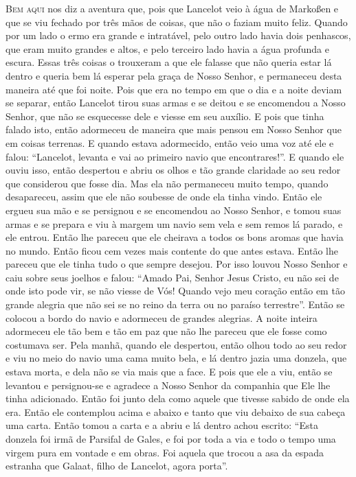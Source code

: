 \textsc{Bem aqui} nos diz a aventura que, pois que Lancelot veio à água de Markoßen
e que se viu fechado por três mãos de coisas, que não o faziam muito feliz. 
Quando por um lado o ermo era grande e intratável, pelo outro lado havia
dois penhascos, que eram muito grandes e altos, e pelo terceiro lado havia a
água profunda e escura. Essas três coisas o trouxeram a que ele falasse que não
queria estar lá dentro e queria bem lá esperar pela graça de Nosso Senhor, e
permaneceu desta maneira até que foi noite. Pois que era no tempo em que o dia
e a noite deviam se separar, então Lancelot tirou suas armas e se deitou e se
encomendou a Nosso Senhor, que não se esquecesse dele e viesse em seu auxílio.
E pois que tinha falado isto, então adormeceu de maneira que mais pensou em
Nosso Senhor que em coisas terrenas. E quando estava adormecido, então veio uma
voz até ele e falou: “Lancelot, levanta e vai ao primeiro navio que
encontrares!”. E quando ele ouviu isso, então despertou e abriu os
olhos e tão grande claridade ao seu redor que considerou que fosse dia. Mas ela
não permaneceu muito tempo, quando desapareceu, assim que ele não soubesse de
onde ela tinha vindo. Então ele ergueu sua mão e se persignou e se encomendou
ao Nosso Senhor, e tomou suas armas e se prepara e viu à margem um navio sem
vela e sem remos lá parado, e ele entrou. Então lhe pareceu que ele cheirava a
todos os bons aromas que havia no mundo. Então ficou cem vezes mais contente do
que antes estava. Então lhe pareceu que ele tinha tudo o que sempre desejou.
Por isso louvou Nosso Senhor e caiu sobre seus joelhos e falou: “Amado Pai,
Senhor Jesus Cristo, eu não sei de onde isto pode vir, se não viesse de Vós!
Quando vejo meu coração então em tão grande alegria que não sei se no reino da
terra ou no paraíso terrestre”. Então se colocou a bordo do navio e adormeceu
de grandes alegrias. A noite inteira adormeceu ele tão bem e tão em paz que não
lhe pareceu que ele fosse como costumava ser. Pela manhã, quando ele despertou,
então olhou todo ao seu redor e viu no meio do navio uma cama muito bela, e lá
dentro jazia uma donzela, que estava morta, e dela não se via mais que a face.
E pois que ele a viu, então se levantou e persignou-se e agradece a Nosso
Senhor da companhia que Ele lhe tinha adicionado. Então foi junto dela como
aquele que tivesse sabido de onde ela era. Então ele contemplou acima e abaixo
e tanto que viu debaixo de sua cabeça uma carta. Então tomou a carta e a abriu
e lá dentro achou escrito: “Esta donzela foi irmã de Parsifal de Gales, e foi
por toda a via e todo o tempo uma virgem pura em vontade e em obras. Foi aquela
que trocou a asa da espada estranha que Galaat, filho de Lancelot, agora
porta”.

